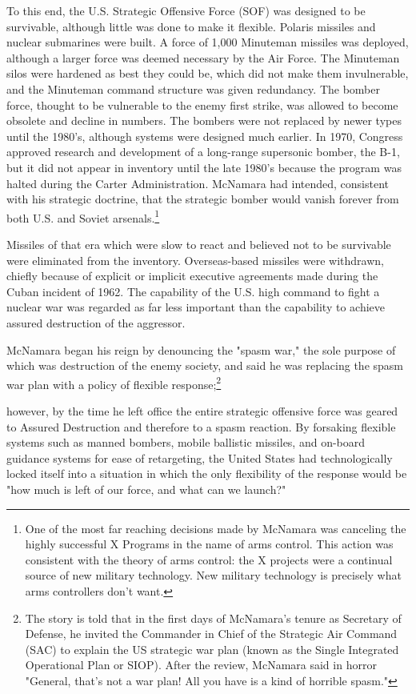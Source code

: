 To this end, the U.S. Strategic Offensive Force (SOF) was designed to be survivable, although little was done to make it flexible. Polaris missiles and nuclear submarines were built. A force of 1,000 Minuteman missiles was deployed, although a larger force was deemed necessary by the Air Force. The Minuteman silos were hardened as best they could be, which did not make them invulnerable, and the Minuteman command structure was given redundancy. The bomber force, thought to be vulnerable to the enemy first strike, was allowed to become obsolete and decline in numbers. The bombers were not replaced by newer types until the 1980's, although systems were designed much earlier. In 1970, Congress approved research and development of a long-range supersonic bomber, the B-1, but it did not appear in inventory until the late 1980's because the program was halted during the Carter Administration. McNamara had intended, consistent with his strategic doctrine, that the strategic bomber would vanish forever from both U.S. and Soviet arsenals.\footnote{One of the most far reaching decisions made by McNamara was canceling the highly successful X Programs in the name of arms control. This action was consistent with the theory of arms control: the X projects were a continual source of new military technology. New military technology is precisely what arms controllers don’t want.}

Missiles of that era which were slow to react and believed not to be survivable were eliminated from the inventory. Overseas-based missiles were withdrawn, chiefly because of explicit or implicit executive agreements made during the Cuban incident of 1962. The capability of the U.S. high command to fight a nuclear war was regarded as far less important than the capability to achieve assured destruction of the aggressor.

McNamara began his reign by denouncing the "spasm war," the sole purpose of which was destruction of the enemy society, and said he was replacing the spasm war plan with a policy of flexible response;\footnote{The story is told that in the first days of McNamara's tenure as Secretary of Defense, he invited the Commander in Chief of the Strategic Air Command (SAC) to explain the US strategic war plan (known as the Single Integrated Operational Plan or SIOP). After the review, McNamara said in horror "General, that's not a war plan! All you have is a kind of horrible spasm."}

however, by the time he left office the entire strategic offensive force was geared to Assured Destruction and therefore to a spasm reaction. By forsaking flexible systems such as manned bombers, mobile ballistic missiles, and on-board guidance systems for ease of retargeting, the United States had technologically locked itself into a situation in which the only flexibility of the response would be "how much is left of our force, and what can we launch?"


